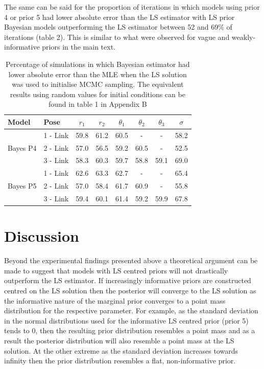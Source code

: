 \documentclass{article}
\begin{document}
The same can be said for the proportion of iterations in which models using prior 4 or prior 5 had lower absolute error than the LS estimator with LS prior Bayesian models outperforming the LS estimator between 52 and 69\% of iterations (table 2).  This is similar to what were observed for vague and weakly-informative priors in the main text.

\begin{table}
	\centering
	\begin{tabular}{l l c c c c c c}
		\hline
		Model & Pose & $r_1$ & $r_2$ & $\theta_1$ & $\theta_2$ & $\theta_3$ & $\sigma$\\
		\hline
		\multirow{3}{*}{Bayes P4} & 1 - Link & 59.8 & 61.2 & 60.5 & - & - & 58.2\\
		& 2 - Link & 57.0 & 56.5 & 59.2 & 60.5 & - & 52.5\\
		& 3 - Link & 58.3 & 60.3 & 59.7 & 58.8 & 59.1 & 69.0\\
		\hline
		\multirow{3}{*}{Bayes P5} & 1 - Link & 62.6 & 63.3 & 62.7 & - & - & 65.4\\
		& 2 - Link & 57.0 & 58.4 & 61.7 & 60.9 & - & 55.8\\
		& 3 - Link & 59.4 & 60.1 & 61.4 & 59.2 & 59.9 & 67.8\\
		\hline

	\end{tabular}
	\caption{Percentage of simulations in which Bayesian estimator had lower absolute error than the MLE when the LS solution was used to initialise MCMC sampling. The equivalent results using random values for initial conditions can be found in table 1 in Appendix B}
	\label{tab:PerformanceTrueVals}
\end{table}

\section{Discussion}
Beyond the experimental findings presented above a theoretical argument can be made to suggest that models with LS centred priors will not drastically outperform the LS estimator.  If increasingly informative priors are constructed centred on the LS solution then the posterior will converge to the LS solution as the informative nature of the marginal prior converges to a point mass distribution for the respective parameter.  For example, as the standard deviation in the normal distributions used for the informative LS centred prior (prior 5) tends to 0, then the resulting prior distribution resembles a point mass and as a result the posterior distribution will also resemble a point mass at the LS solution.  At the other extreme as the standard deviation increases towards infinity then the prior distribution resembles a flat, non-informative prior.



\end{document}

